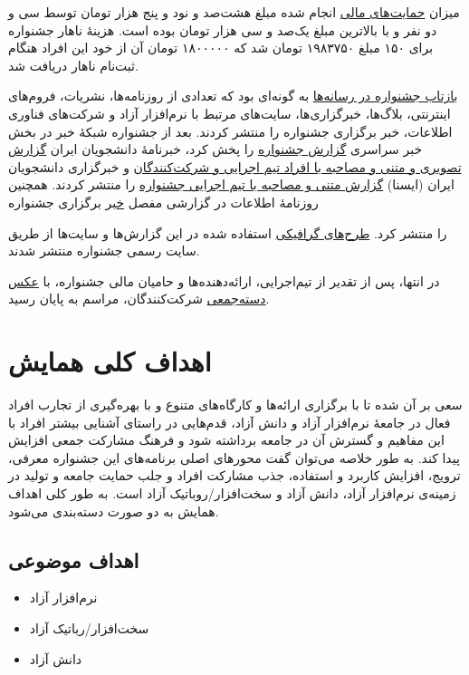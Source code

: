 \documentclass{article}
\begin{document}
{میزان \href{http://sfd.fsug.ir/1395/patronage/donation}{حمایت‌های مالی} انجام شده مبلغ هشت‌صد و نود و پنج هزار تومان توسط سی و دو نفر و با بالاترین مبلغ یک‌صد و سی هزار تومان بوده است. هزینهٔ ناهار جشنواره برای ۱۵۰ مبلغ ۱۹۸۳۷۵۰ تومان شد که ۱۸۰۰۰۰۰ تومان آن از خود این افراد هنگام ثبت‌نام ناهار دریافت شد.

\href{http://sfd.fsug.ir/1395/in-media}{بازتاب جشنواره در رسانه‌ها} به گونه‌ای بود که تعدادی از روزنامه‌ها، نشریات، فروم‌های اینترنتی، بلاگ‌ها، خبرگزاری‌ها، سایت‌های مرتبط با نرم‌افزار آزاد و شرکت‌های فناوری اطلاعات، خبر برگزاری جشنواره را منتشر کردند. بعد از جشنواره شبکهٔ خبر در بخش خبر سراسری
\href{https://www.youtube.com/watch?v=8_l08Xr975E&list=PLzkZTZKm4j8HDREDT5RXSpHJVmy06pN0D&index=1}{گزارش جشنواره}
را پخش کرد، خبرنامهٔ دانشجویان ایران
\href{https://www.youtube.com/watch?v=1hipivGBRvo&index=5&list=PLzkZTZKm4j8HDREDT5RXSpHJVmy06pN0D}{گزارش تصویری و متنی و مصاحبه با افراد تیم اجرایی و شرکت‌کنندگان} و
خبرگزاری دانشجویان ایران (ایسنا)
\href{http://www.isna.ir/news/95070804754/جشنواره-روز-آزادی-نرم-افزار-به-میزبانی-دانشگاه-صنعتی-شریف-برگزار}{گزارش متنی و مصاحبه با تیم اجرایی جشنواره}
را منتشر کردند. همچنین روزنامهٔ اطلاعات در گزارشی مفصل 
\href{http://www.ettelaat.com/etiran/?p=236726}خبر برگزاری جشنواره} 
را منتشر کرد. \href{http://sfd.fsug.ir/1395/artworks}{طرح‌های گرافیکی} استفاده شده در این گزارش‌ها و سایت‌ها از طریق سایت رسمی جشنواره منتشر شدند.

در انتها، پس از تقدیر از تیم‌اجرایی، ارائه‌دهنده‌ها و حامیان مالی جشنواره، با \href{http://sfd.fsug.ir/1395/photos}{عکس دسته‌جمعی} شرکت‌کنندگان، مراسم به پایان رسید.





\section{اهداف کلی همایش}
سعی بر آن شده تا با برگزاری ارائه‌ها و کارگاه‌های متنوع و با بهره‌گیری از تجارب افراد فعال در جامعهٔ نرم‌افزار آزاد و دانش آزاد، قدم‌هایی در راستای آشنایی بیشتر افراد با این مفاهیم و گسترش آن در جامعه برداشته شود و فرهنگ مشارکت جمعی افزایش پیدا کند. به طور خلاصه می‌توان گفت محورهای اصلی برنامه‌های این جشنواره معرفی، ترویج، افزایش کاربرد و استفاده، جذب مشارکت افراد و جلب حمایت جامعه و تولید در زمینه‌ی نرم‌افزار آزاد، دانش آزاد و سخت‌افزار/روباتیک آزاد است. به طور کلی اهداف همایش به دو صورت دسته‌بندی می‌شود.

\subsection{اهداف موضوعی}
\begin{flushright}

\begin{itemize}
\item نرم‌افزار آزاد
\item سخت‌افزار/رباتیک آزاد
\item دانش آزاد
\end{itemize}
\end{flushright}
\end{document}
